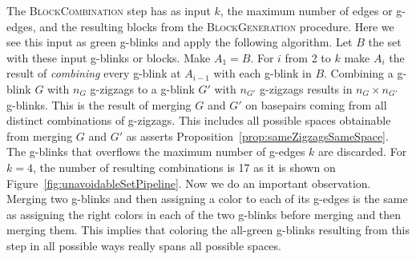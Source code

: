 The \textsc{BlockCombination} step has as input $k$, the maximum number
of edges or g-edges, and the resulting blocks from the \textsc{BlockGeneration}
procedure. Here we see this input as green g-blinks and apply the
following algorithm. Let $B$ the set with these
input g-blinks or blocks. Make $A_1 = B$. For $i$ from 2 to $k$ make
$A_i$ the result of {\it combining} every g-blink at $A_{i-1}$ with each
g-blink in $B$. Combining a g-blink $G$ with $n_G$ g-zigzags to a
g-blink $G'$ with $n_{G'}$ g-zigzags results in $n_G \times n_{G'}$
g-blinks. This is the result of merging $G$ and $G'$ on
basepairs coming from all distinct combinations of g-zigzags. This
includes all possible spaces obtainable from merging $G$ and $G'$
as asserts Proposition~\ref{prop:sameZigzagsSameSpace}. The g-blinks
that overflows the maximum number of g-edges $k$ are discarded. For $k=4$,
the number of resulting combinations is 17 as it is shown on
Figure~\ref{fig:unavoidableSetPipeline}. Now we do an important
observation. Merging two g-blinks and then assigning a color to
each of its g-edges is the same as assigning the right colors in each
of the two g-blinks before merging and then merging them. This implies
that coloring the all-green g-blinks resulting from this step in all
possible ways really spans all possible spaces.

